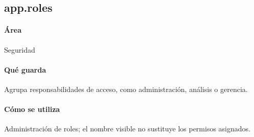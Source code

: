 \subsection{app.roles}
\paragraph{Área} Seguridad

\paragraph{Qué guarda} Agrupa responsabilidades de acceso, como administración, análisis o gerencia.

\paragraph{Cómo se utiliza} Administración de roles; el nombre visible no sustituye los permisos asignados.

